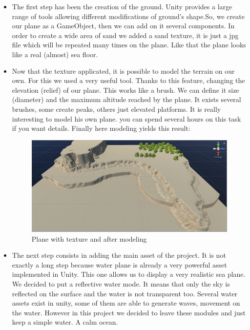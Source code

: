 \documentclass[a4paper]{report}
\begin{document}
\begin{itemize}
\item The first step has been the creation of the ground. Unity provides a large range of tools allowing different modifications of ground's shape.So, we create our plane as a GameObject, then we can add on it several components. In order to create a wide area of sand we added a sand texture, it is just a jpg file which will be repeated many times on the plane. Like that the plane looks like a real (almost) sea floor. 
\item Now that the texture applicated, it is possible to model the terrain on our own. For this we used a very useful tool. Thanks to this feature, changing the elevation (relief) of our plane. This works like a brush. We can define it size (diameter) and the maximum altitude reached by the plane. It exists several brushes, some create peaks, others just elevated platforms. It is really interesting to model his own plane. you can spend several hours on this task if you want details. Finally here modeling yields this result:

\begin{figure}[H]
	\centering
    \includegraphics[scale=0.4]{image/unity2.jpg}
    \caption{Plane with texture and after modeling}
	\end{figure}
    
\item The next step consists in adding the main asset of the project. It is not exactly a long step because water plane is already a very powerful asset implemented in Unity. This one allows us to display a very realistic sea plane. We decided to put a reflective water mode. It means that only the sky is reflected on the surface and the water is not transparent too. Several water assets exist in unity, some of them are able to generate waves, movement on the water. However in this project we decided to leave these modules and just keep a simple water. A calm ocean.



\end{itemize}
\end{document}
